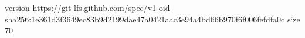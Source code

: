version https://git-lfs.github.com/spec/v1
oid sha256:1e361d3f3649ec83b9d2199dae47a0421aac3e94a4bd66b970f6f006fefdfa0c
size 70
